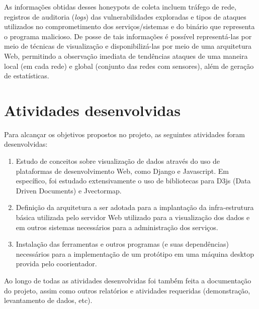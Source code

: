 \documentclass[Portuguese]
{ic-tese-v2}
\begin{document}
As informações obtidas desses honeypots de coleta incluem tráfego de rede, registros de auditoria (\emph{logs}) das vulnerabilidades exploradas e tipos de ataques utilizados no comprometimento dos serviços/sistemas e do binário que representa o programa malicioso. De posse de tais informações é possível representá-las  por meio de técnicas de visualização e disponibilizá-las por meio de uma arquitetura Web, permitindo a observação imediata de tendências ataques de uma maneira local (em cada rede) e global (conjunto das redes com sensores), além de geração de estatísticas.


\chapter{Atividades desenvolvidas}

Para alcançar os objetivos propostos no projeto, as seguintes atividades foram desenvolvidas:

\begin{enumerate}
\item Estudo de conceitos sobre visualização de dados através do uso de plataformas de desenvolvimento Web, como Django e Javascript. Em específico, foi estudado extensivamente o uso de bibliotecas para D3js\cite{d3js} (Data Driven Documents) e Jvectormap.\\
\item Definição da arquitetura a ser adotada para a implantação da infra-estrutura básica utilizada pelo servidor Web utilizado para a visualização dos dados e em outros sistemas necessários para a administração dos serviços.\\
\item Instalação das ferramentas e outros programas (e suas dependências) necessários para a implementação de um protótipo em uma máquina desktop provida pelo coorientador.\\
\end{enumerate}

Ao longo de todas as atividades desenvolvidas foi també́m feita a documentação do projeto, assim como outros relatórios e atividades requeridas (demonstração, levantamento de dados, etc).
\end{document}
